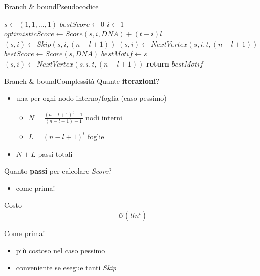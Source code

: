 	\begin{frame}{Branch \& bound}{Pseudocodice}
		\begin{center}\scriptsize
			\begin{minipage}{7.5cm}
			    \begin{algorithmic}[1]
					    \State $s\gets (1,1,\dots,1)$
					    \State $bestScore\gets 0$
					    \State $i\gets 1$
								\State $optimisticScore\gets Score(s,i,DNA)+(t-i)l$
									\State $(s,i)\gets Skip(s,i,(n-l+1))$
								\Else
									\State $(s,i)\gets NextVertex(s,i,t,(n-l+1))$
								\EndIf
							\Else
									\State $bestScore\gets Score(s,DNA)$
									\State $bestMotif\gets s$
								\EndIf
								\State $(s,i)\gets NextVertex(s,i,t,(n-l+1))$
							\EndIf
					    \EndWhile
					    \State \textbf{return} $bestMotif$
				    \EndProcedure
			    \end{algorithmic}
			\end{minipage}
	    \end{center}
	\end{frame}
	
	\begin{frame}{Branch \& bound}{Complessità}
		Quante \alert{\textbf{iterazioni}}?
		\pause
		\begin{itemize}
			\item una per ogni nodo interno/foglia (caso pessimo)
			\pause
			\begin{itemize}
				\item $N=\frac{(n-l+1)^t-1}{(n-l+1)-1}$ nodi interni
				\item $L=(n-l+1)^t$ foglie
				\pause
			\end{itemize}
			\item $N+L$ passi totali
		\end{itemize}
		\pause
		Quanto \alert{\textbf{passi}} per calcolare \textit{Score}?
		\pause
		\begin{itemize}
			\item come prima!
		\end{itemize}
		\pause
		\begin{center}
			\begin{minipage}{3cm}
				\begin{varblock}{Costo}
					$$\mathcal{O}(tln^t)$$
				\end{varblock}
			\end{minipage}
		\end{center}
		\pause
		Come prima!
		\begin{itemize}
			\item più costoso nel caso pessimo
			\item conveniente se esegue tanti \textit{Skip}
		\end{itemize}
	\end{frame}
	
